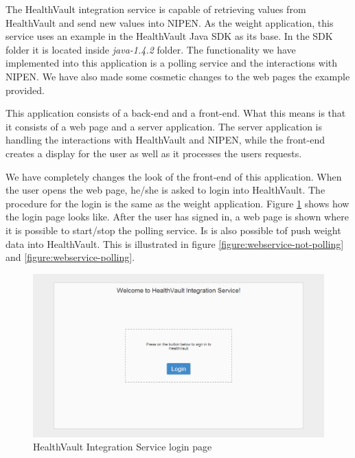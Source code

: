 The HealthVault integration service is capable of retrieving values from HealthVault and send new values into NIPEN. 
As the weight application, this service uses an example in the HealthVault Java SDK \cite{HealthVaultSDK} as its base.
In the SDK folder it is located inside \textit{java-1.4.2} folder.
The functionality we have implemented into this application is a polling service and the interactions with NIPEN.
We have also made some cosmetic changes to the web pages the example provided.

This application consists of a back-end and a front-end.
What this means is that it consists of a web page and a server application.
The server application is handling the interactions with HealthVault and NIPEN, while the front-end creates a display for the user as well as it processes the users requests.

We have completely changes the look of the front-end of this application.
When the user opens the web page, he/she is asked to login into HealthVault.
The procedure for the login is the same as the weight application.
Figure \ref{figure:webservice-login} shows how the login page looks like.
After the user has signed in, a web page is shown where it is possible to start/stop the polling service.
Is is also possible tof push weight data into HealthVault. 
This is illustrated in figure \ref{figure:webservice-not-polling} and \ref{figure:webservice-polling}.

\begin{figure}[H]
\centering
\includegraphics[scale=0.4]{../Figures/webservice-login.png}
\caption{HealthVault Integration Service login page}
\label{figure:webservice-login}
\end{figure}

